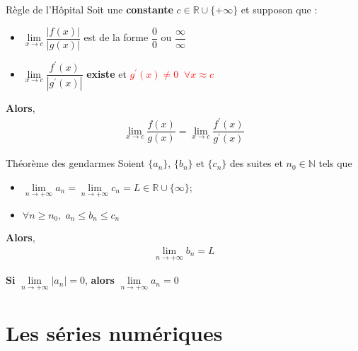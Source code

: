 \documentclass[16pt]{report}
\begin{document}
\begin{multicols*}{2}
    \begin{Theorem}{Règle de l'Hôpital}{}
        Soit une \textbf{constante} $c \in \mathbb{R} \cup \{+\infty\}$ et supposon que : 
        \begin{itemize}
        \item $\lim\limits_{x\to c}\dfrac{|f(x)|}{|g(x)|}$ 
            est de la forme $\dfrac{0}{0}$ ou 
            $\dfrac{\infty }{\infty }$
        \item $\lim\limits_{x\to c}\dfrac{f^{\prime}(x)}{|g^{\prime}(x)|}$
            \textbf{existe} et 
            \textcolor{red}{$g^{\prime}(x) \neq 0 \;\; \forall x \approx c$ }
        \end{itemize}
        \textbf{Alors}, 
        \begin{align*}
            \lim\limits_{x\to c}\dfrac{f(x)}{g(x)} = 
            \lim\limits_{x\to c}\dfrac{f^{\prime}(x)}{g^{\prime}(x)}
        \end{align*}
        
    \end{Theorem}


    \begin{Theorem}{Théorème des gendarmes}{}
        Soient $\{a_n\}$, $\{b_n\}$ et $\{c_n\}$ des suites et $n_0 \in \mathbb{N}$ tels 
        que
        \begin{itemize}
            \item $\lim\limits_{n\to+\infty}a_n  = 
                \lim\limits_{n\to+\infty}c_n  = L 
                \in \mathbb{R} \cup \{\infty \}$; 
            \item $\forall n \geq n_0, \; a_n \leq b_n \leq c_n$ 
        \end{itemize}
        \textbf{Alors},
        \begin{align*}
            \lim\limits_{n\to+\infty}b_n  = L                   
        \end{align*}
    \end{Theorem}

    \begin{corollary*}
         \textbf{Si} $\lim\limits_{n\to+\infty}|a_n|  = 0$, 
         \textbf{alors}      
         $\lim\limits_{n\to+\infty}a_n  = 0$
    \end{corollary*}
    \columnbreak

    \chapter{Les séries numériques}


\end{multicols*}
\end{document}
